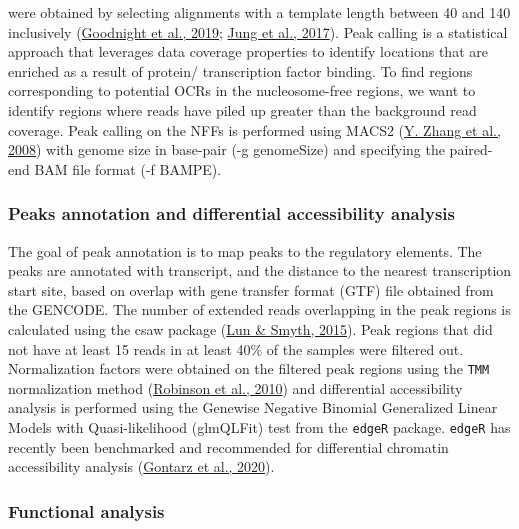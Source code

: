 \documentclass[12pt,twoside]{reedthesis}
\begin{document}
were obtained by selecting alignments with a template length between 40
and 140 inclusively (\protect\hyperlink{ref-goodnight2019}{Goodnight et al., 2019}; \protect\hyperlink{ref-jung2017}{Jung et al., 2017}). Peak calling is a
statistical approach that leverages data coverage properties to identify
locations that are enriched as a result of protein/ transcription factor
binding. To find regions corresponding to potential OCRs in the
nucleosome-free regions, we want to identify regions where reads have
piled up greater than the background read coverage. Peak calling on the
NFFs is performed using MACS2 (\protect\hyperlink{ref-zhang2008}{Y. Zhang et al., 2008}) with genome size in base-pair
(-g genomeSize) and specifying the paired-end BAM file format (-f
BAMPE).

\hypertarget{m3.3.2}{%
\subsubsection*{Peaks annotation and differential accessibility analysis}\label{m3.3.2}}

The goal of peak annotation is to map peaks to the regulatory elements.
The peaks are annotated with transcript, and the distance to the nearest
transcription start site, based on overlap with gene transfer format
(GTF) file obtained from the GENCODE. The number of extended reads
overlapping in the peak regions is calculated using the csaw package
(\protect\hyperlink{ref-lun2015}{Lun \& Smyth, 2015}). Peak regions that did not have at least 15 reads in at least
40\% of the samples were filtered out. Normalization factors were
obtained on the filtered peak regions using the \texttt{TMM} normalization
method (\protect\hyperlink{ref-robinson2010}{Robinson et al., 2010}) and differential accessibility analysis is
performed using the Genewise Negative Binomial Generalized Linear Models
with Quasi-likelihood (glmQLFit) test from the \texttt{edgeR} package. \texttt{edgeR}
has recently been benchmarked and recommended for differential chromatin
accessibility analysis (\protect\hyperlink{ref-gontarz2020}{Gontarz et al., 2020}).

\hypertarget{m3.3.3}{%
\subsubsection*{Functional analysis}\label{m3.3.3}}
\end{document}
